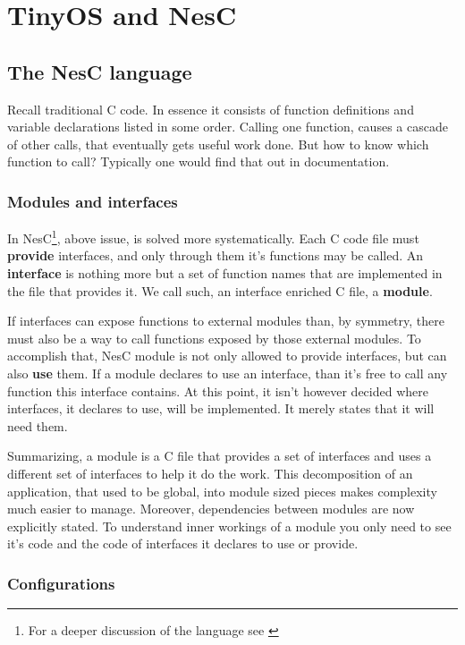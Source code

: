 \chapter{TinyOS and NesC}

\section{The NesC language}

Recall traditional C code. In essence it consists of function
definitions and variable declarations listed in some order.  Calling
one function, causes a cascade of other calls, that eventually gets
useful work done. But how to know which function to call? Typically one
would find that out in documentation.

\subsection{Modules and interfaces}

In NesC\footnote{For a deeper discussion of the language see
\cite{NesC}}, above issue, is solved more systematically.  Each C code
file must {\bf provide} interfaces, and only through them it's
functions may be called. An {\bf interface} is nothing more but a set
of function names that are implemented in the file that provides it.
We call such, an interface enriched C file, a {\bf module}.

If interfaces can expose functions to external modules than, by
symmetry, there must also be a way to call functions exposed by those
external modules. To accomplish that, NesC module is not only allowed
to provide interfaces, but can also {\bf use} them. If a module declares to
use an interface, than it's free to call any function this interface
contains. At this point, it isn't however decided where interfaces, it
declares to use, will be implemented. It merely states that it will
need them.

Summarizing, a module is a C file that provides a set of interfaces
and uses a different set of interfaces to help it do the work. This
decomposition of an application, that used to be global, into module
sized pieces makes complexity much easier to manage. Moreover,
dependencies between modules are now explicitly stated. To understand
inner workings of a module you only need to see it's code and the code
of interfaces it declares to use or provide.

\subsection{Configurations}

